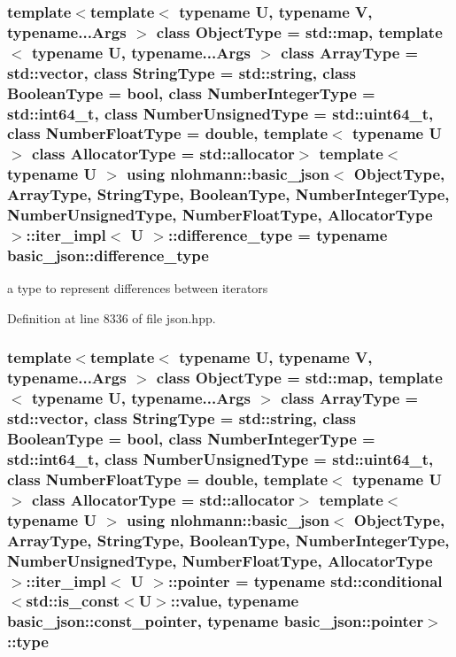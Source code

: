 \subsubsection[{difference\+\_\+type}]{\setlength{\rightskip}{0pt plus 5cm}template$<$template$<$ typename U, typename V, typename...\+Args $>$ class Object\+Type = std\+::map, template$<$ typename U, typename...\+Args $>$ class Array\+Type = std\+::vector, class String\+Type  = std\+::string, class Boolean\+Type  = bool, class Number\+Integer\+Type  = std\+::int64\+\_\+t, class Number\+Unsigned\+Type  = std\+::uint64\+\_\+t, class Number\+Float\+Type  = double, template$<$ typename U $>$ class Allocator\+Type = std\+::allocator$>$ template$<$typename U $>$ using {\bf nlohmann\+::basic\+\_\+json}$<$ Object\+Type, Array\+Type, String\+Type, Boolean\+Type, Number\+Integer\+Type, Number\+Unsigned\+Type, Number\+Float\+Type, Allocator\+Type $>$\+::{\bf iter\+\_\+impl}$<$ U $>$\+::{\bf difference\+\_\+type} =  typename {\bf basic\+\_\+json\+::difference\+\_\+type}}\label{classnlohmann_1_1basic__json_1_1iter__impl_a088519ca37ae2be2c1f1bbc4868dc878}


a type to represent differences between iterators 



Definition at line 8336 of file json.\+hpp.

\hypertarget{classnlohmann_1_1basic__json_1_1iter__impl_a3b56ff21ecdde2dc147288ee64cff0fd}{}
\subsubsection[{pointer}]{\setlength{\rightskip}{0pt plus 5cm}template$<$template$<$ typename U, typename V, typename...\+Args $>$ class Object\+Type = std\+::map, template$<$ typename U, typename...\+Args $>$ class Array\+Type = std\+::vector, class String\+Type  = std\+::string, class Boolean\+Type  = bool, class Number\+Integer\+Type  = std\+::int64\+\_\+t, class Number\+Unsigned\+Type  = std\+::uint64\+\_\+t, class Number\+Float\+Type  = double, template$<$ typename U $>$ class Allocator\+Type = std\+::allocator$>$ template$<$typename U $>$ using {\bf nlohmann\+::basic\+\_\+json}$<$ Object\+Type, Array\+Type, String\+Type, Boolean\+Type, Number\+Integer\+Type, Number\+Unsigned\+Type, Number\+Float\+Type, Allocator\+Type $>$\+::{\bf iter\+\_\+impl}$<$ U $>$\+::{\bf pointer} =  typename std\+::conditional$<$std\+::is\+\_\+const$<$U$>$\+::{\bf value}, typename {\bf basic\+\_\+json\+::const\+\_\+pointer}, typename {\bf basic\+\_\+json\+::pointer}$>$\+::{\bf type}}\label{classnlohmann_1_1basic__json_1_1iter__impl_a3b56ff21ecdde2dc147288ee64cff0fd}


